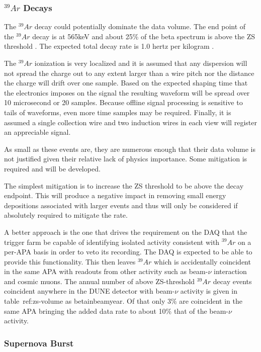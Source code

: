 \subsubsection{$^{39}Ar$ Decays}

The $^{39}Ar$ decay could potentially dominate the data volume.
The end point of the $^{39}Ar$ decay is at 565keV and about
25\% of the beta spectrum is above the ZS threshold \cite{ar39endpoint}.
The expected total decay rate is 1.0 hertz per kilogram \cite{ar39bkg}.

The $^{39}Ar$ ionization is very localized and it is assumed that any
dispersion will not spread the charge out to any extent larger than a
wire pitch nor the distance the charge will drift over one sample.
Based on the expected shaping time that the electronics imposes on the
signal the resulting waveform will be spread over
10 microsecond or 20 samples.
Because offline signal processing is sensitive to tails of waveforms,
even more time samples may be required.
Finally, it is assumed a single collection wire and two induction
wires in each view will register an appreciable signal.

As small as these events are, they are numerous enough that their data
volume is not justified given their relative lack of physics importance.
Some mitigation is required and will be developed.

The simplest mitigation is to increase the ZS threshold to be above
the decay endpoint.
This will produce a negative impact in removing small energy
depositions associated with larger events and thus will only be
considered if absolutely required to mitigate the rate.

A better approach is the one that drives the requirement on the DAQ
that the trigger farm be capable of identifying isolated activity
consistent with $^{39}Ar$ on a per-APA basis in order to veto its
recording.
The DAQ is expected to be able to provide this functionality.
This then leaves $^{39}Ar$ which is accidentally coincident in the
same APA with readouts from other activity such as beam-$\nu$
interaction and cosmic muons.
The annual number of above ZS-threshold $^{39}Ar$ decay events
coincident anywhere in the DUNE detector with beam-$\nu$ activity is
given in table~{ref:zs-volume} as betainbeamyear.
Of that only 3\% are coincident in the same APA bringing the added
data rate to about 10\% that of the beam-$\nu$ activity.

\subsubsection{Supernova Burst}

